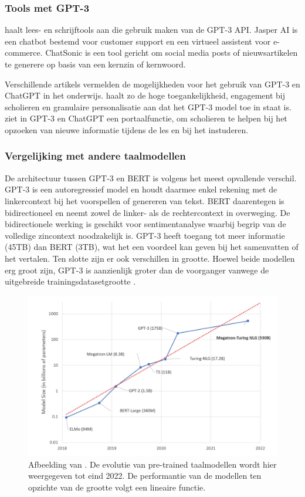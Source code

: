 \subsubsection{Tools met GPT-3}

\textcite{Mottesi2023} haalt lees- en schrijftools aan die gebruik maken van de GPT-3 API. Jasper AI is een chatbot bestemd voor customer support en een virtueel assistent voor e-commerce. ChatSonic is een tool gericht om social media posts of nieuwsartikelen te generere op basis van een kernzin of kernwoord. 

Verschillende artikels vermelden de mogelijkheden voor het gebruik van GPT-3 en ChatGPT in het onderwijs. \textcite{Roose2023} haalt zo de hoge toegankelijkheid, engagement bij scholieren en granulaire personalisatie aan dat het GPT-3 model toe in staat is. \textcite{Garg2022} ziet in GPT-3 en ChatGPT een portaalfunctie, om scholieren te helpen bij het opzoeken van nieuwe informatie tijdens de les en bij het instuderen.

\subsubsection{Vergelijking met andere taalmodellen}

De architectuur tussen GPT-3 en BERT is volgens \textcite{Mottesi2023} het meest opvallende verschil. GPT-3 is een autoregressief model en houdt daarmee enkel rekening met de linkercontext bij het voorspellen of genereren van tekst. BERT daarentegen is bidirectioneel en neemt zowel de linker- als de rechtercontext in overweging. De bidirectionele werking is geschikt voor sentimentanalyse waarbij begrip van de volledige zincontext noodzakelijk is. GPT-3 heeft toegang tot meer informatie (45TB) dan BERT (3TB), wat het een voordeel kan geven bij het samenvatten of het vertalen. Ten slotte zijn er ook verschillen in grootte. Hoewel beide modellen erg groot zijn, GPT-3 is aanzienlijk groter dan de voorganger vanwege de uitgebreide trainingsdatasetgrootte \autocite{Brown2020}.


\begin{figure}[H]
	\includegraphics{img/graph-language-models.png}
	\caption{Afbeelding van \textcite{Simon2021}. De evolutie van pre-trained taalmodellen wordt hier weergegeven tot eind 2022. De performantie van de modellen ten opzichte van de grootte volgt een lineaire functie.}
\end{figure}

